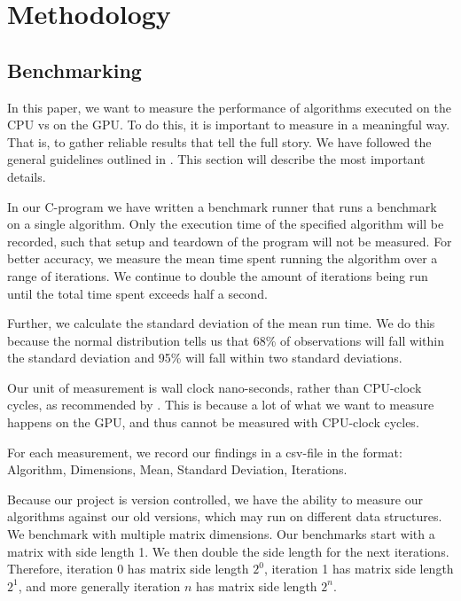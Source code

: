 
\section{Methodology}
\label{sect:methodology}

\subsection{Benchmarking} \label{subsect:benchmark}
In this paper, we want to measure the performance of algorithms executed on the CPU vs on the GPU. To do this, it is important to measure in a meaningful way. That is, to gather reliable results that tell the full story. We have followed the general guidelines outlined in \cite[Sect. 3]{sestoft:benchmarks}. This section will describe the most important details. 

In our C-program we have written a benchmark runner that runs a benchmark on a single algorithm. Only the execution time of the specified algorithm will be recorded, such that setup and teardown of the program will not be measured. For better accuracy, we measure the mean time spent running the algorithm over a range of iterations. We continue to double the amount of iterations being run until the total time spent exceeds half a second.

Further, we calculate the standard deviation of the mean run time. We do this because the normal distribution tells us that 68\% of observations will fall within the standard deviation and 95\% will fall within two standard deviations.

Our unit of measurement is wall clock nano-seconds, rather than CPU-clock cycles, as recommended by \cite{sestoft:benchmarks}. This is because a lot of what we want to measure happens on the GPU, and thus cannot be measured with CPU-clock cycles. 

For each measurement, we record our findings in a csv-file in the format: Algorithm, Dimensions, Mean, Standard Deviation, Iterations. 

Because our project is version controlled, we have the ability to measure our algorithms against our old versions, which may run on different data structures.\\

\noindent We benchmark with multiple matrix dimensions. Our benchmarks start with a matrix with side length 1. We then double the side length for the next iterations. Therefore, iteration 0 has matrix side length $2^0$, iteration 1 has matrix side length $2^1$, and more generally iteration $n$ has matrix side length $2^n$.

